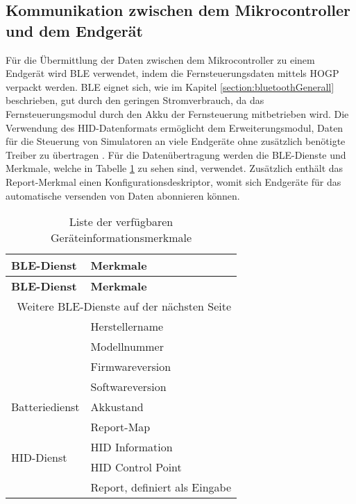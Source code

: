 \subsection{Kommunikation zwischen dem Mikrocontroller und dem Endgerät}
\label{section:communicationModuleDevice}
Für die Übermittlung der Daten zwischen dem Mikrocontroller zu einem Endgerät wird \ac{BLE} verwendet, indem die Fernsteuerungsdaten mittels \ac{HOGP} verpackt werden. \ac{BLE} eignet sich, wie im Kapitel \ref{section:bluetoothGenerall} beschrieben, gut durch den geringen Stromverbrauch, da das Fernsteuerungsmodul durch den Akku der Fernsteuerung mitbetrieben wird. Die Verwendung des \ac{HID}-Datenformats ermöglicht dem Erweiterungsmodul, Daten für die Steuerung von Simulatoren an viele Endgeräte ohne zusätzlich benötigte Treiber zu übertragen \cite{microsoftHID}. Für die Datenübertragung werden die \ac{BLE}-Dienste und Merkmale, welche in Tabelle \ref{table:usedServicesAndCharacteristics} zu sehen sind, verwendet. Zusätzlich enthält das Report-Merkmal einen Konfigurationsdeskriptor, womit sich Endgeräte für das automatische versenden von Daten abonnieren können.

\begin{longtable}[c]{|l|l|}
    \caption{Liste der verfügbaren Geräteinformationsmerkmale}
    \label{table:usedServicesAndCharacteristics}\\
    \hline
    \textbf{\ac{BLE}-Dienst} & \textbf{Merkmale}\\
    \hline
    \hline
    \endfirsthead

    \hline
    \textbf{\ac{BLE}-Dienst} & \textbf{Merkmale}\\
    \hline
    \hline
    \endhead

    \hline
    \multicolumn{2}{|r|}{Weitere \ac{BLE}-Dienste auf der nächsten Seite}\\
    \hline
    \endfoot

    \hline
    \endlastfoot
    
    \multirow{4}{*}{Geräteinformationsdienst} & Herstellername\\
    \cline{2-2}
     & Modellnummer\\
     \cline{2-2}
     & Firmwareversion\\
     \cline{2-2}
     & Softwareversion\\
    \hline
    \multirow{1}{*}{Batteriedienst} & Akkustand\\
    \hline
    \multirow{4}{*}{\ac{HID}-Dienst} & Report-Map\\
    \cline{2-2}
     & \ac{HID} Information\\
     \cline{2-2}
     & \ac{HID} Control Point\\
     \cline{2-2}
     & Report, definiert als Eingabe\\
\end{longtable}

